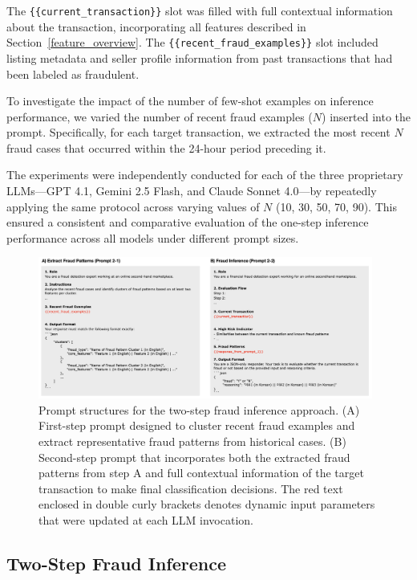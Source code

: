 \documentclass[sigconf]{acmart}
\begin{document}
The \texttt{\{\{current\_transaction\}\}} slot was filled with full contextual information about the transaction, incorporating all features described in Section~\ref{feature_overview}. The \texttt{\{\{recent\_fraud\_examples\}\}} slot included listing metadata and seller profile information from past transactions that had been labeled as fraudulent.

To investigate the impact of the number of few-shot examples on inference performance, we varied the number of recent fraud examples ($N$) inserted into the prompt. Specifically, for each target transaction, we extracted the most recent $N$ fraud cases that occurred within the 24-hour period preceding it. 

The experiments were independently conducted for each of the three proprietary LLMs—GPT 4.1, Gemini 2.5 Flash, and Claude Sonnet 4.0—by repeatedly applying the same protocol across varying values of $N$ (10, 30, 50, 70, 90). This ensured a consistent and comparative evaluation of the one-step inference performance across all models under different prompt sizes.


\begin{figure}[t!]
  \centering
  \includegraphics[width=0.98\textwidth]{./figures/fig_prompt_2step.png}
  \caption{Prompt structures for the two-step fraud inference approach. (A) First-step prompt designed to cluster recent fraud examples and extract representative fraud patterns from historical cases. (B) Second-step prompt that incorporates both the extracted fraud patterns from step A and full contextual information of the target transaction to make final classification decisions. The red text enclosed in double curly brackets denotes dynamic input parameters that were updated at each LLM invocation.}
  \label{fig_prompt_2step}
\end{figure}





\subsection{Two-Step Fraud Inference}\label{two_step_inference}
\end{document}
